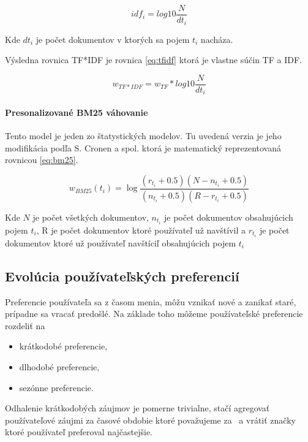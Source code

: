 \begin{equation} \label{eq:idf}
idf_i = log{10}\frac{N}{dt_i}
\end{equation}

Kde \(dt_i\) je počet dokumentov v ktorých sa pojem \(t_i\) nacháza.

Výsledna rovnica TF*IDF je rovnica \ref{eq:tfidf} ktorá je vlastne súčin TF a IDF.

\begin{equation} \label{eq:tfidf}
w_{TF*IDF} = w_{TF} * log{10}\frac{N}{dt_i}
\end{equation}


\paragraph{Presonalizované BM25 váhovanie}

Tento model je jeden zo štatystických modelov. Tu uvedená verzia je 
jeho modifikácia podľa S. Cronen a spol. \cite{modified_bm25} ktorá
je matematický reprezentovaná rovnicou \ref{eq:bm25}.

\begin{equation} \label{eq:bm25}
w_{BM25}(t_i) = \log{
    \frac{(r_{t_i} + 0.5)(N - n_{t_i} + 0.5)}
        {(n_{t_i} + 0.5)(R - r_{t_i} + 0.5)}}
\end{equation}

Kde \(N\) je počet všetkých dokumentov, \(n_{t_i}\) je počet
dokumentov obsahujúcich pojem \(t_i\), R je počet dokumentov
ktoré používateľ už navštívil a \(r_{t_i}\) je počet dokumentov ktoré
už používateľ navštíciľ obsahujúcich pojem \(t_i\)

\subsection{Evolúcia používateľských preferencií}

Preferencie používateľa sa z časom menia, môžu vznikať nové a zanikať staré,
prípadne sa vracať predošlé. Na základe toho môžeme používateľské preferencie rozdeliť
na 

\begin{itemize}
\item{krátkodobé preferencie,}
\item{dlhodobé preferencie,}
\item{sezónne preferencie.}
\end{itemize}

Odhalenie krátkodobých záujmov je pomerne trivialne, stačí agregovať používateľové záujmi
za časové obdobie ktoré považujeme za  a vrátiť značky ktoré používateľ 
preferoval najčastejšie.

